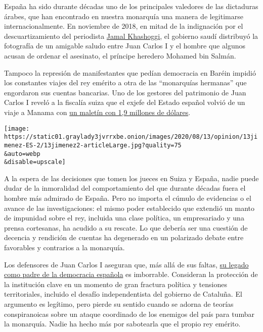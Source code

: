 España ha sido durante décadas uno de los principales valedores de las
dictaduras árabes, que han encontrado en nuestra monarquía una manera de
legitimarse internacionalmente. En noviembre de 2018, en mitad de la
indignación por el descuartizamiento del periodista
\href{https://www.nytimes3xbfgragh.onion/es/2019/06/21/espanol/opinion/jamal-khashoggi-asesinato.html}{Jamal
Khashoggi}, el gobierno saudí distribuyó la fotografía de un amigable
saludo entre Juan Carlos I y el hombre que algunos acusan de ordenar el
asesinato, el príncipe heredero Mohamed bin Salmán.

Tampoco la represión de manifestantes que pedían democracia en Baréin
impidió los constantes viajes del rey emérito a otra de las ``monarquías
hermanas'' que engordaron sus cuentas bancarias. Uno de los gestores del
patrimonio de Juan Carlos I reveló a la fiscalía suiza que el exjefe del
Estado español volvió de un viaje a Manama con
\href{https://english.elpais.com/spanish_news/2020-05-02/spains-former-king-received-alleged-17m-donation-from-ruler-of-bahrain-swiss-probe-shows.html}{un
maletín con 1,9 millones de dólares}.

\texttt{[image: https://static01.graylady3jvrrxbe.onion/images/2020/08/13/opinion/13jimenez-ES-2/13jimenez2-articleLarge.jpg?quality=75\\\&auto=webp\\\&disable=upscale]}

A la espera de las decisiones que tomen los jueces en Suiza y España,
nadie puede dudar de la inmoralidad del comportamiento del que durante
décadas fuera el hombre más admirado de España. Pero no importa el
cúmulo de evidencias o el avance de las investigaciones: el mismo poder
establecido que extendió un manto de impunidad sobre el rey, incluida
una clase política, un empresariado y una prensa cortesanas, ha acudido
a su rescate. Lo que debería ser una cuestión de decencia y rendición de
cuentas ha degenerado en un polarizado debate entre favorables y
contrarios a la monarquía.

Los defensores de Juan Carlos I aseguran que, más allá de sus faltas,
\href{https://www.euronews.com/2020/08/04/spain-s-ex-king-juan-carlos-from-hero-of-democracy-to-tainted-exile}{su
legado como padre de la democracia española} es imborrable. Consideran
la protección de la institución clave en un momento de gran fractura
política y tensiones territoriales, incluido el desafío independentista
del gobierno de Cataluña. El argumento es legítimo, pero pierde su
sentido cuando se adorna de teorías conspiranoicas sobre un ataque
coordinado de los enemigos del país para tumbar la monarquía. Nadie ha
hecho más por sabotearla que el propio rey emérito.

